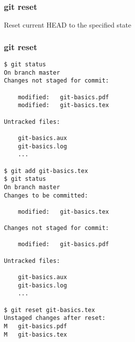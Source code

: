 \documentclass{beamer}
\begin{document}

\begin{frame}
\frametitle{git reset}
Reset current HEAD to the specified state
\end{frame}


\begin{frame}[fragile]
\frametitle{git reset}
	\tiny
	\begin{verbatim}
$ git status
On branch master
Changes not staged for commit:

	modified:   git-basics.pdf
	modified:   git-basics.tex

Untracked files:

	git-basics.aux
	git-basics.log
	...

$ git add git-basics.tex
$ git status
On branch master
Changes to be committed:

	modified:   git-basics.tex

Changes not staged for commit:

	modified:   git-basics.pdf

Untracked files:

	git-basics.aux
	git-basics.log
	...

$ git reset git-basics.tex
Unstaged changes after reset:
M	git-basics.pdf
M	git-basics.tex
	\end{verbatim}
\end{frame}
\end{document}
